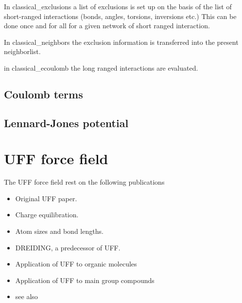 \documentclass[11pt,a4paper]{report}
\begin{document}
In classical\_exclusions a list of exclusions is set up on the basis
of the list of short-ranged interactions (bonds, angles, torsions,
inversions etc.) This can be done once and for all for a given network
of short ranged interaction.

In classical\_neighbors the exclusion information is transferred into
the present neighborlist.

in classical\_ecoulomb the long ranged interactions are evaluated.


\subsection{Coulomb terms}
\subsection{Lennard-Jones potential}



\section{UFF force field}
The UFF force field rest on the following publications
\begin{itemize}
\item Original UFF paper\cite{rappe92_jacs114_10024}.
\item Charge equilibration\cite{rappe91_jpc95_3358}.
\item Atom sizes and bond lengths\cite{okeefe92_jacs113_3226}.
\item DREIDING\cite{mayo90_jpc90_8897}, a predecessor of UFF.
\item Application of UFF to organic molecules\cite{casewit92_jacs114_10035}
\item Application of UFF to main group compounds\cite{casewit92_jacs114_11046}
\item see also\cite{addicoat14_jctc10_880}
\end{itemize}
\end{document}
